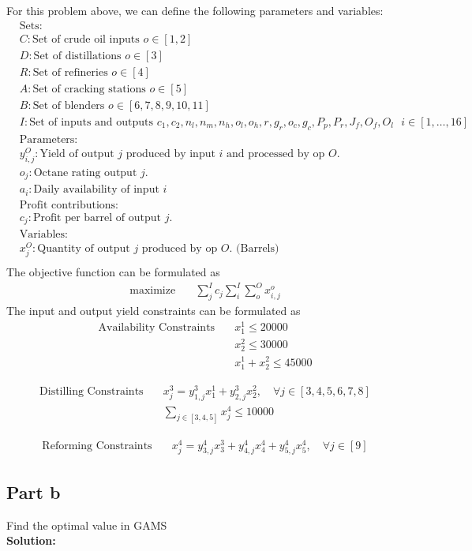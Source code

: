 \documentclass[11pt]{article}
\begin{document}
For this problem above, we can define the following parameters and variables:
\begin{align*}
& \text{Sets: } \\
& C: \text{Set of crude oil inputs } o \in [1,2] \\
& D: \text{Set of distillations } o \in [3] \\
& R: \text{Set of refineries } o \in [4] \\
& A: \text{Set of cracking stations } o \in [5] \\
& B: \text{Set of blenders } o \in [6,7,8,9,10,11] \\
& I: \text{Set of inputs and outputs $c_1,c_2,n_l, n_m, n_h, o_l, o_h, r, g_r, o_c, g_c, P_p, P_r, J_f, O_f, O_l$ } i \in [1,\dots,16] \\
& \text{Parameters:} \\
& y_{i,j}^O: \text{Yield of output $j$ produced by input $i$ and processed by op $O$.} \\
& o_{j}: \text{Octane rating output $j$.} \\
& a_i: \text{Daily availability of input $i$} \\
& \text{Profit contributions:} \\
& c_{j}: \text{Profit per barrel of output $j$.} \\
& \text{Variables:} \\
& x_{j}^O : \text{Quantity of output $j$ produced by op $O$. (Barrels)} \\
\end{align*}
The objective function can be formulated as 
\begin{align*}
  \text{maximize} & \quad  \sum_{j}^I c_{j} \sum_{i}^I \sum_{o}^O x_{i,j}^o
\end{align*}
The input and output yield constraints can be formulated as
\begin{align*}
  \text{Availability Constraints} & \quad x_{1}^1 \leq 20000 \\ 
  & \quad x_{2}^2 \leq 30000 \\
  & \quad x_{1}^1 + x_{2}^2 \leq 45000
\end{align*}

\begin{align*}
  \text{Distilling Constraints} & \quad x_{j}^3 = y_{1,j}^3 x_{1}^1 + y_{2,j}^3 x_{2}^2, \quad \forall j \in [3,4,5,6,7,8] \\
  & \quad \sum_{j \in [3,4,5]} x_{j}^4 \leq 10000
\end{align*}

\begin{align*}
  \text{Reforming Constraints} & \quad x_{j}^4 = y_{3,j}^4 x_{3}^3 + y_{4,j}^4 x_{4}^4 +  y_{5,j}^4 x_{5}^4, \quad \forall j \in [9]
\end{align*}





\subsection{Part b}
Find the optimal value in GAMS
\\
\textbf{Solution: }
\end{document}
